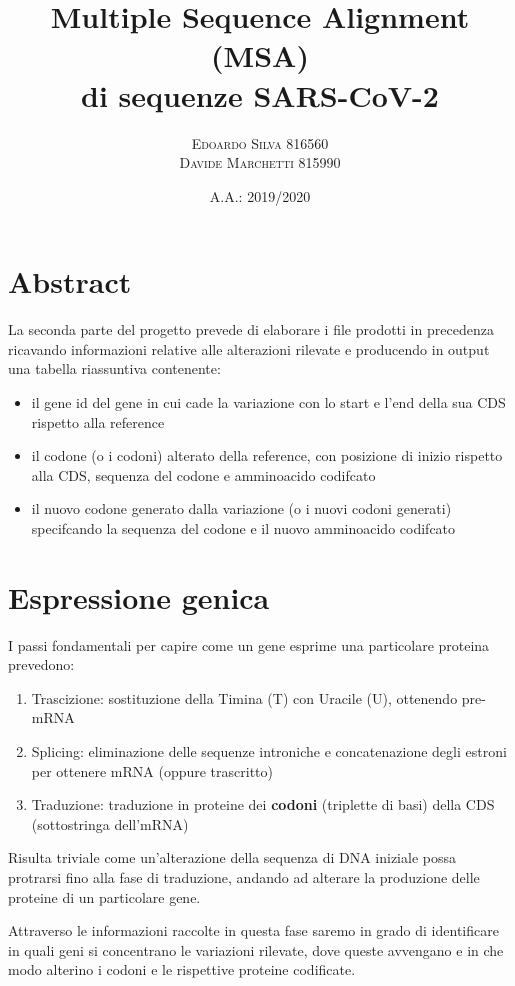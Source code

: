 \documentclass[11pt,italian]{article}
\title{Multiple Sequence Alignment (MSA) \\ di sequenze SARS-CoV-2}
\date{A.A.: 2019/2020}
\author{
    \textsc{Edoardo Silva} 816560 \\
    \textsc{Davide Marchetti} 815990
}
\begin{document}
\maketitle

\section{Abstract}
La seconda parte del progetto prevede di elaborare i file prodotti in precedenza ricavando informazioni relative alle alterazioni rilevate e producendo in output una tabella riassuntiva contenente:
\begin{itemize}
  \item il gene id del gene in cui cade la variazione con lo start e l'end della sua CDS rispetto alla reference
  \item il codone (o i codoni) alterato della reference, con posizione di inizio rispetto alla CDS, sequenza del codone e amminoacido codifcato
  \item il nuovo codone generato dalla variazione (o i nuovi codoni generati) specifcando la sequenza del codone e il nuovo amminoacido codifcato
\end{itemize}

\newpage
\section{Espressione genica}
I passi fondamentali per capire come un gene esprime una particolare proteina prevedono:
\begin{enumerate}
  \item Trascizione: sostituzione della Timina (T) con Uracile (U), ottenendo pre-mRNA
  \item Splicing: eliminazione delle sequenze introniche e concatenazione degli estroni per ottenere mRNA (oppure trascritto)
  \item Traduzione: traduzione in proteine dei \textbf{codoni} (triplette di basi) della CDS (sottostringa dell’mRNA)
\end{enumerate}

\noindent
Risulta triviale come un'alterazione della sequenza di DNA iniziale possa protrarsi fino alla fase di traduzione, andando ad alterare la produzione delle proteine di un particolare gene.

\vspace{1mm}
Attraverso le informazioni raccolte in questa fase saremo in grado di identificare in quali geni si concentrano le variazioni rilevate, dove queste avvengano e in che modo alterino i codoni e le rispettive proteine codificate.
\end{document}
